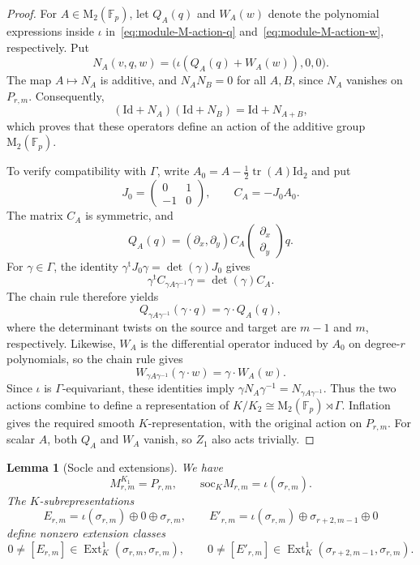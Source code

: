 \documentclass[10pt]{article}
\theoremstyle{plain}
\newtheorem{lemma}[theorem]{Lemma}
\theoremstyle{definition}
\theoremstyle{remark}
\newcommand{\Fp}{\mathbb{F}_p}
\newcommand{\Mat}{\mathrm{M}}
\newcommand{\soc}{\mathrm{soc}}
\newcommand{\Id}{\mathrm{Id}}
\begin{document}
\begin{proof}
For $A\in\Mat_2(\Fp)$, let $Q_A(q)$ and $W_A(w)$ denote the polynomial expressions inside $\iota$ in~\eqref{eq:module-M-action-q} and~\eqref{eq:module-M-action-w}, respectively. Put
\[
N_A(v,q,w)=\bigl(\iota(Q_A(q)+W_A(w)),0,0\bigr).
\]
The map $A\mapsto N_A$ is additive, and $N_AN_B=0$ for all $A,B$, since $N_A$ vanishes on $P_{r,m}$. Consequently,
\[
(\Id+N_A)(\Id+N_B)=\Id+N_{A+B},
\]
which proves that these operators define an action of the additive group $\Mat_2(\Fp)$.

To verify compatibility with $\Gamma$, write $A_0=A-\tfrac12\operatorname{tr}(A)\Id_2$ and put
\[
J_0=\begin{pmatrix}0&1\\-1&0\end{pmatrix},\qquad
C_A=-J_0A_0.
\]
The matrix $C_A$ is symmetric, and
\[
Q_A(q)=(\partial_x,\partial_y)C_A
\begin{pmatrix}\partial_x\\\partial_y\end{pmatrix}q.
\]
For $\gamma\in\Gamma$, the identity $\gamma^{\mathrm t}J_0\gamma=\det(\gamma)J_0$ gives
\[
\gamma^{\mathrm t}C_{\gamma A\gamma^{-1}}\gamma=\det(\gamma)C_A.
\]
The chain rule therefore yields
\[
Q_{\gamma A\gamma^{-1}}(\gamma\cdot q)=\gamma\cdot Q_A(q),
\]
where the determinant twists on the source and target are $m-1$ and $m$, respectively. Likewise, $W_A$ is the differential operator induced by $A_0$ on degree-$r$ polynomials, so the chain rule gives
\[
W_{\gamma A\gamma^{-1}}(\gamma\cdot w)=\gamma\cdot W_A(w).
\]
Since $\iota$ is $\Gamma$-equivariant, these identities imply $\gamma N_A\gamma^{-1}=N_{\gamma A\gamma^{-1}}$. Thus the two actions combine to define a representation of $K/K_2\cong\Mat_2(\Fp)\rtimes\Gamma$. Inflation gives the required smooth $K$-representation, with the original action on $P_{r,m}$. For scalar $A$, both $Q_A$ and $W_A$ vanish, so $Z_1$ also acts trivially.
\end{proof}

\begin{lemma}[Socle and extensions]\label{lem:module-M-extensions}
We have
\[
M_{r,m}^{K_1}=P_{r,m},\qquad
\soc_K M_{r,m}=\iota(\sigma_{r,m}).
\]
The $K$-subrepresentations
\[
E_{r,m}=\iota(\sigma_{r,m})\oplus0\oplus\sigma_{r,m},
\qquad
E'_{r,m}=\iota(\sigma_{r,m})\oplus\sigma_{r+2,m-1}\oplus0
\]
define nonzero extension classes
\[
0\ne[E_{r,m}]\in\operatorname{Ext}^1_K(\sigma_{r,m},\sigma_{r,m}),
\qquad
0\ne[E'_{r,m}]\in\operatorname{Ext}^1_K(\sigma_{r+2,m-1},\sigma_{r,m}).
\]
\end{lemma}
\end{document}
